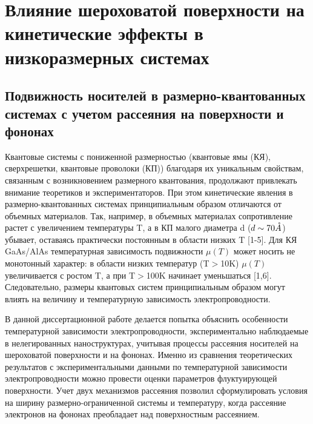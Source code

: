 \chapter{Влияние шероховатой поверхности на кинетические эффекты в низкоразмерных системах} \label{chapt3}

\section{ Подвижность носителей в размерно-квантованных системах с учетом рассеяния на поверхности и фононах}

Квантовые системы с пониженной размерностью (квантовые ямы (КЯ), сверхрешетки, квантовые проволоки (КП)) благодаря их уникальным свойствам, связанным с возникновением размерного квантования, продолжают привлекать внимание теоретиков и экспериментаторов. При этом кинетические явления в размерно-квантованных системах принципиальным образом отличаются от объемных материалов. Так, например, в объемных материалах сопротивление растет с увеличением температуры T, а в КП малого диаметра d ($d \sim 70 \AA$) убывает, оставаясь практически постоянным в области низких T \cite{Lin2000,Lin2003,Heremans1998,Zhang2000,Heremans2000}[1-5]. Для КЯ GaAs/AlAs температурная зависимость подвижности $\mu (T)$ может носить не монотонный характер: в области низких температур (T$>$10K) $\mu (T)$ увеличивается с ростом T, а при T$>$100K начинает уменьшаться \cite{Lin2000,Sakaki1987}[1,6]. Следовательно, размеры квантовых систем принципиальным образом могут влиять на величину и температурную зависимость электропроводности.

В данной диссертационной работе делается попытка объяснить особенности температурной зависимости электропроводности, экспериментально наблюдаемые в нелегированных наноструктурах, учитывая процессы рассеяния носителей на шероховатой поверхности и на фононах. Именно из сравнения теоретических результатов с экспериментальными данными по температурной зависимости электропроводности можно провести оценки параметров флуктуирующей поверхности. Учет двух механизмов рассеяния позволил сформулировать условия на ширину размерно-ограниченной системы и температуру, когда рассеяние электронов на фононах преобладает над поверхностным рассеянием.


